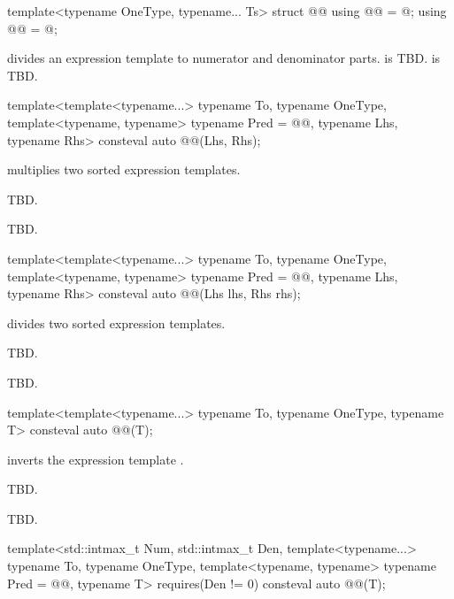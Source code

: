\begin{codeblock}
template<typename OneType, typename... Ts>
struct @@ {
  using @@ = @\seebelownc@;
  using @@ = @\seebelownc@;
}
\end{codeblock}

\pnum
{} divides an expression template to numerator and denominator parts.
 is TBD.
 is TBD.

\begin{itemdecl}
template<template<typename...> typename To, typename OneType,
         template<typename, typename> typename Pred = @@, typename Lhs, typename Rhs>
consteval auto @@(Lhs, Rhs);
\end{itemdecl}

\begin{itemdescr}
\pnum
{} multiplies two sorted expression templates.

\pnum
\effects
TBD.

\pnum
\returns
TBD.
\end{itemdescr}

\begin{itemdecl}
template<template<typename...> typename To, typename OneType,
         template<typename, typename> typename Pred = @@, typename Lhs, typename Rhs>
consteval auto @@(Lhs lhs, Rhs rhs);
\end{itemdecl}

\begin{itemdescr}
\pnum
{} divides two sorted expression templates.

\pnum
\effects
TBD.

\pnum
\returns
TBD.
\end{itemdescr}

\begin{itemdecl}
template<template<typename...> typename To, typename OneType, typename T>
consteval auto @@(T);
\end{itemdecl}

\begin{itemdescr}
\pnum
{} inverts the expression template .

\pnum
\effects
TBD.

\pnum
\returns
TBD.
\end{itemdescr}

\begin{itemdecl}
template<std::intmax_t Num, std::intmax_t Den, template<typename...> typename To,
         typename OneType, template<typename, typename> typename Pred = @@, typename T>
  requires(Den != 0)
consteval auto @@(T);
\end{itemdecl}


